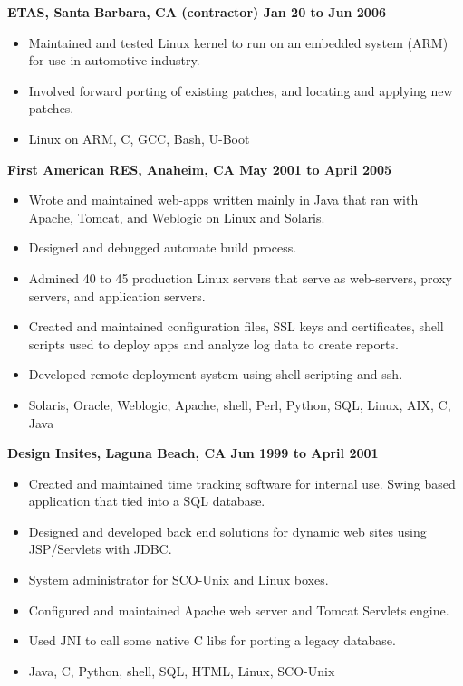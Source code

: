 \documentclass{res}
\begin{document}
\begin{resume}
{\large \bf ETAS, Santa Barbara, CA (contractor) \hfill Jan 20 to Jun 2006}
\begin{itemize}
\item Maintained and tested Linux kernel to run on an embedded
system (ARM) for use in automotive industry.
\item Involved forward porting of existing patches, and locating and applying
new patches.
\item  Linux on ARM, C, GCC, Bash, U-Boot
\end{itemize}


{\large \bf First American RES, Anaheim, CA \hfill May 2001 to April 2005}
\begin{itemize}
\item Wrote and maintained web-apps written mainly in Java that ran
with Apache, Tomcat, and Weblogic on Linux and Solaris.
\item Designed and debugged automate build process.
\item Admined 40 to 45 production Linux servers that serve as
web-servers, proxy servers, and application servers.
\item Created and maintained configuration files,
SSL keys and certificates, shell scripts used to deploy apps and
analyze log data to create reports.
\item Developed remote deployment system using shell scripting and
ssh.
\item  Solaris, Oracle, Weblogic, Apache, shell, Perl, Python,
SQL, Linux, AIX, C, Java
\end{itemize}

{\large \bf Design Insites, Laguna Beach, CA \hfill Jun 1999 to April 2001}
\begin{itemize}
\item Created and maintained time tracking software for internal use.
Swing based application that tied into a SQL database.
\item Designed and developed back end solutions for dynamic web
sites using JSP/Servlets with JDBC.
\item System administrator for SCO-Unix and Linux boxes.
\item Configured and maintained Apache web server and Tomcat Servlets
engine.
\item Used JNI to call some native C libs for porting a legacy database.
\item  Java, C, Python, shell,  SQL, HTML, Linux, SCO-Unix
\end{itemize}


\end{resume}
\end{document}
